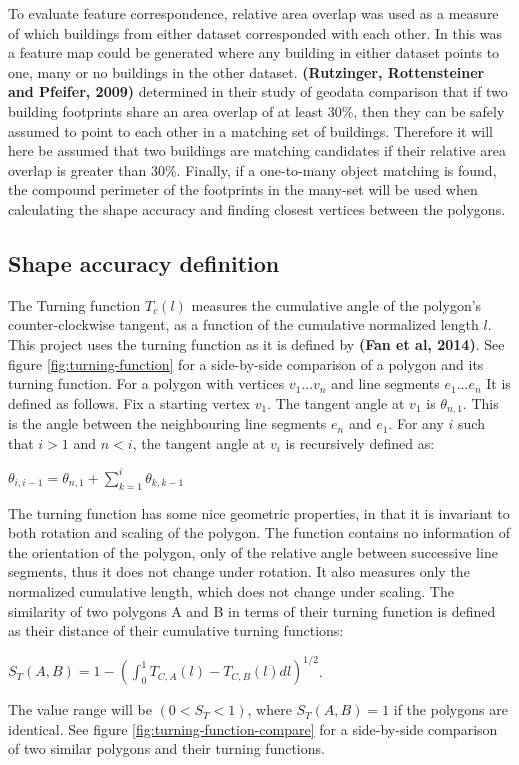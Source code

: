\documentclass{kththesis}
\begin{document}
To evaluate feature correspondence, relative area overlap was used as a measure of which buildings from either dataset corresponded with each other.
In this was a feature map could be generated where any building in either dataset points to one, many or no buildings in the other dataset.
\textbf{(Rutzinger, Rottensteiner and Pfeifer, 2009)} determined in their study of geodata comparison that if two building footprints share an area overlap of at least 30\%, then they can be safely assumed to point to each other in a matching set of buildings.
Therefore it will here be assumed that two buildings are matching candidates if their relative area overlap is greater than 30\%.
Finally, if a one-to-many object matching is found, the compound perimeter of the footprints in the many-set will be used when calculating the shape accuracy and finding closest vertices between the polygons.

\subsection{Shape accuracy definition}

The Turning function $T_c(l)$ measures the cumulative angle of the polygon's counter-clockwise tangent, as a function of the cumulative normalized length $l$.
This project uses the turning function as it is defined by \textbf{(Fan et al, 2014)}.
See figure \ref{fig:turning-function} for a side-by-side comparison of a polygon and its turning function.
For a polygon with vertices ${v_1 ... v_n}$ and line segments ${e_1 ... e_n}$ It is defined as follows.
Fix a starting vertex $v_1$.
The tangent angle at $v_1$ is $\theta_{n,1}$. This is the angle between the neighbouring line segments $e_n$ and $e_1$.
For any $i$ such that $i>1$ and $n<i$, the tangent angle at $v_i$ is recursively defined as:
\begin{center}
    $\theta_{i, i-1} = \theta_{n,1} + \sum^{i}_{k=1} \theta_{k, k-1}$
\end{center}
The turning function has some nice geometric properties, in that it is invariant to both rotation and scaling of the polygon. The function contains no information of the orientation of the polygon, only of the relative angle between successive line segments, thus it does not change under rotation. It also measures only the normalized cumulative length, which does not change under scaling.
The similarity of two polygons A and B in terms of their turning function is defined as their distance of their cumulative turning functions:
\begin{center}
    $S_{T}(A, B) = 1 - (\int^{1}_{0} T_{C,A}(l) - T_{C,B}(l) dl)^{1/2}$.
\end{center}
The value range will be $(0 < S_{T} < 1)$, where $S_{T}(A,B) = 1$ if the polygons are identical. 
See figure \ref{fig:turning-function-compare} for a side-by-side comparison of two similar polygons and their turning functions.
\end{document}
